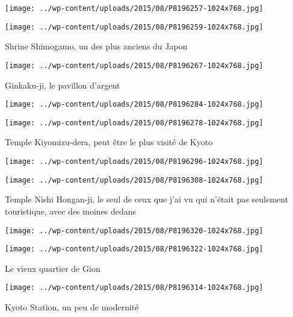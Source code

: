  \newline
\centerline{\texttt{[image: ../wp-content/uploads/2015/08/P8196257-1024x768.jpg]} } 
 \newline
 \newline
\centerline{\texttt{[image: ../wp-content/uploads/2015/08/P8196259-1024x768.jpg]} } 
 \newline
 Shrine Shimogamo, un des plus anciens du Japon \newline
 \newline
\centerline{\texttt{[image: ../wp-content/uploads/2015/08/P8196267-1024x768.jpg]} } 
 \newline
 Ginkaku-ji, le pavillon d'argent \newline
 \newline
\centerline{\texttt{[image: ../wp-content/uploads/2015/08/P8196284-1024x768.jpg]} } 
 \newline
 \newline
\centerline{\texttt{[image: ../wp-content/uploads/2015/08/P8196278-1024x768.jpg]} } 
 \newline
 Temple Kiyomizu-dera, peut être le plus visité de Kyoto \newline
 \newline
\centerline{\texttt{[image: ../wp-content/uploads/2015/08/P8196296-1024x768.jpg]} } 
 \newline
 \newline
\centerline{\texttt{[image: ../wp-content/uploads/2015/08/P8196308-1024x768.jpg]} } 
 \newline
 Temple Nishi Hongan-ji, le seul de ceux que j'ai vu qui n'était pas seulement touristique, avec des moines dedans \newline
 \newline
\centerline{\texttt{[image: ../wp-content/uploads/2015/08/P8196320-1024x768.jpg]} } 
 \newline
 \newline
\centerline{\texttt{[image: ../wp-content/uploads/2015/08/P8196322-1024x768.jpg]} } 
 \newline
 Le vieux quartier de Gion \newline
 \newline
\centerline{\texttt{[image: ../wp-content/uploads/2015/08/P8196314-1024x768.jpg]} } 
 \newline
 Kyoto Station, un peu de modernité \newline
